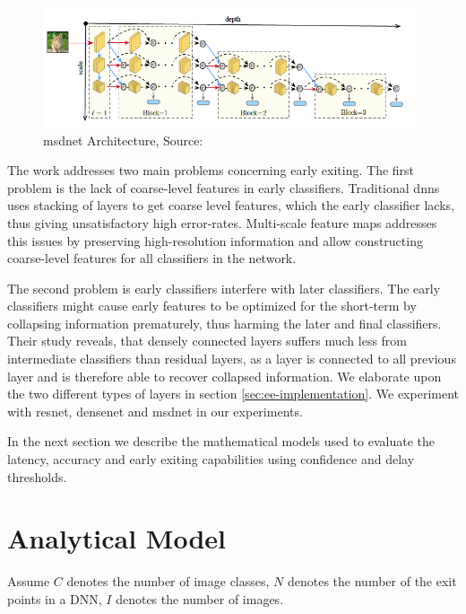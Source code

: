 \begin{figure}
	\centering
	\includegraphics[width=\linewidth]{figures/models/msdnet}
	\caption[\gls{msdnet} Architecture]{\gls{msdnet} Architecture, Source:  \cite{huang_multi-scale_2017}}
	\label{fig:msdnet}
\end{figure}

The work addresses two main problems concerning early exiting. The first problem is the lack of coarse-level features in early classifiers. Traditional \gls{dnn}s uses stacking of layers to get coarse level features, which the early classifier lacks, thus giving unsatisfactory high error-rates. Multi-scale feature maps addresses this issues by preserving high-resolution information and allow constructing coarse-level features for all classifiers in the network.

The second problem is early classifiers interfere with later classifiers. The early classifiers might cause early features to be optimized for the short-term by collapsing information prematurely, thus harming the later and final classifiers. Their study reveals, that densely connected layers suffers much less from intermediate classifiers than residual layers, as a layer is connected to all previous layer and is therefore able to recover collapsed information. We elaborate upon the two different types of layers in section \ref{sec:ee-implementation}. We experiment with \gls{resnet}, \gls{densenet} and \gls{msdnet} in our experiments.

In the next section we describe the mathematical models used to evaluate the latency, accuracy and early exiting capabilities using confidence and delay thresholds.

\section{Analytical Model} \label{sec:ee-metrics}

Assume $ C $ denotes the number of image classes, $ N $ denotes the number of the exit points in a DNN, $ I $ denotes the number of images.

